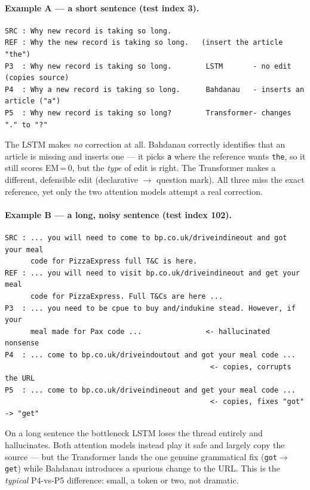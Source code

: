 \documentclass[11pt,a4paper]{article}
\begin{document}
\paragraph{Example A --- a short sentence (test index 3).}
\begin{lstlisting}
SRC : Why new record is taking so long.
REF : Why the new record is taking so long.   (insert the article "the")
P3  : Why new record is taking so long.        LSTM       - no edit (copies source)
P4  : Why a new record is taking so long.      Bahdanau   - inserts an article ("a")
P5  : Why new record is taking so long?        Transformer- changes "." to "?"
\end{lstlisting}
The LSTM makes \emph{no} correction at all. Bahdanau correctly identifies that
an article is missing and inserts one --- it picks \texttt{a} where the
reference wants \texttt{the}, so it still scores EM\,=\,0, but the \emph{type}
of edit is right. The Transformer makes a different, defensible edit
(declarative $\rightarrow$ question mark). All three miss the exact reference,
yet only the two attention models attempt a real correction.

\paragraph{Example B --- a long, noisy sentence (test index 102).}
\begin{lstlisting}
SRC : ... you will need to come to bp.co.uk/driveindineout and got your meal
      code for PizzaExpress full T&C is here.
REF : ... you will need to visit bp.co.uk/driveindineout and get your meal
      code for PizzaExpress. Full T&Cs are here ...
P3  : ... you need to be cpue to buy and/indukine stead. However, if your
      meal made for Pax code ...               <- hallucinated nonsense
P4  : ... come to bp.co.uk/driveindoutout and got your meal code ...
                                                <- copies, corrupts the URL
P5  : ... come to bp.co.uk/driveindineout and get your meal code ...
                                                <- copies, fixes "got" -> "get"
\end{lstlisting}
On a long sentence the bottleneck LSTM loses the thread entirely and
hallucinates. Both attention models instead play it safe and largely copy the
source --- but the Transformer lands the one genuine grammatical fix
(\texttt{got}$\rightarrow$\texttt{get}) while Bahdanau introduces a spurious
change to the URL. This is the \emph{typical} P4-vs-P5 difference: small, a
token or two, not dramatic.
\end{document}
